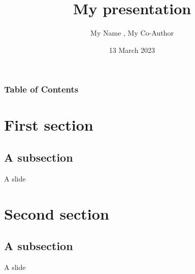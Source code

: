 \documentclass[aspectratio=169, 12pt]{beamer}    %
\title[Beamer title]
{My presentation
}
\author[]{My Name \inst{1}, My Co-Author\inst{2}}
\institute
{\inst{1}  Engineering, Computer Mathematical Sciences (ECMS) \\
\inst{2}  Engineering, Computer Mathematical Sciences (ECMS) 
}
\date{
13 March 2023
}
\begin{document}
\begin{frame}
    \maketitle
\end{frame}


\begin{sectionframe}
\frametitle{Table of Contents}
\tableofcontents[hideallsubsections]
\end{sectionframe}



\section{First section}


\subsection{A subsection}
\begin{frame}[fragile = singleslide]{A slide}
 


\end{frame}
\section{Second section}

\subsection{A subsection}
\begin{frame}[fragile = singleslide]{A slide}
 


\end{frame}

%
%




\begin{titleframe}
\end{titleframe}
\end{document}
